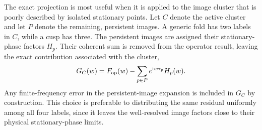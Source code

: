 \documentclass[aps,prd,twocolumn,nofootinbib,superscriptaddress,floatfix]{revtex4-2}
\newcommand{\ii}{\mathrm{i}}
\begin{document}
The exact projection is most useful when it is applied to the image cluster
that is poorly described by isolated stationary points.  Let $C$ denote the
active cluster and let $P$ denote the remaining, persistent images.  A generic
fold has two labels in $C$, while a cusp has three.  The persistent images are
assigned their stationary-phase factors $H_p$.  Their coherent sum is removed
from the operator result, leaving the exact contribution associated with the
cluster,
\begin{equation}
 G_C(w)=F_{\rm op}(w)-\sum_{p\in P}e^{\ii w\tau_p}H_p(w).
 \label{eq:exact-cluster-total}
\end{equation}
Any finite-frequency error in the persistent-image expansion is included in
$G_C$ by construction.  This choice is preferable to distributing the same
residual uniformly among all four labels, since it leaves the well-resolved
image factors close to their physical stationary-phase limits.
\end{document}

